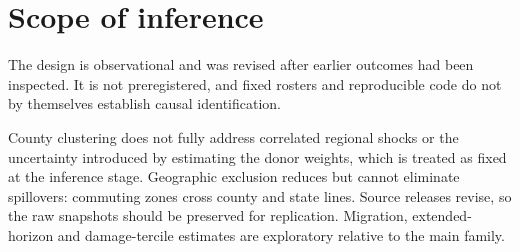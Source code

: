 \documentclass[11pt,a4paper]{article}
\begin{document}
\section{Scope of inference}

The design is observational and was revised after earlier outcomes had been
inspected. It is not preregistered, and fixed rosters and reproducible code do
not by themselves establish causal identification.

County clustering does not fully address correlated regional shocks or the
uncertainty introduced by estimating the donor weights, which is treated as
fixed at the inference stage. Geographic exclusion reduces but cannot eliminate
spillovers: commuting zones cross county and state lines. Source releases
revise, so the raw snapshots should be preserved for replication. Migration,
extended-horizon and damage-tercile estimates are exploratory relative to the
main family.
\end{document}
